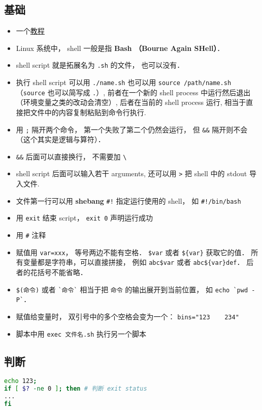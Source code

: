 
\begin{issues}
\issueDraft
\end{issues}


\subsection{基础}
\begin{itemize}
\item 一个\href{https://tldp.org/LDP/abs/html/why-shell.html}{教程}
\item Linux 系统中， shell 一般是指 \textbf{Bash （Bourne Again SHell）}．
\item shell script 就是拓展名为 \verb`.sh` 的文件， 也可以没有．
\item 执行 shell script 可以用 \verb`./name.sh` 也可以用 \verb`source /path/name.sh` （\verb|source| 也可以简写成 \verb|.|）, 前者在一个新的 shell process 中运行然后退出（环境变量之类的改动会清空）, 后者在当前的 shell process 运行, 相当于直接把文件中的内容复制粘贴到命令行执行.
\item 用 \verb|;| 隔开两个命令， 第一个失败了第二个仍然会运行， 但 \verb|&&| 隔开则不会（这个其实是逻辑与算符）．
\item \verb|&&| 后面可以直接换行， 不需要加 \verb|\|
\item shell script 后面可以输入若干 arguments, 还可以用 \verb`>` 把 shell 中的 stdout 导入文件.
\item 文件第一行可以用 \textbf{shebang} \verb`#!` 指定运行使用的 shell， 如 \verb`#!/bin/bash`
\item 用 \verb|exit| 结束 script， \verb`exit 0` 声明运行成功
\item 用 \verb`#` 注释
\item 赋值用 \verb`var=xxx`， 等号两边不能有空格． \verb|$var| 或者 \verb|${var}| 获取它的值． 所有变量都是字符串，可以直接拼接， 例如 \verb|abc$var| 或者 \verb|abc${var}def|． 后者的花括号不能省略．
\item \verb|$(命令)| 或者 \verb|`命令`| 相当于把 \verb|命令| 的输出展开到当前位置， 如 \verb|echo `pwd -P`|．
\item 赋值给变量时， 双引号中的多个空格会变为一个： \verb|bins="123    234"|
\item 脚本中用 \verb|exec 文件名.sh| 执行另一个脚本
\end{itemize}

\subsection{判断}
\begin{lstlisting}[language=bash]
echo 123;
if [ $? -ne 0 ]; then # 判断 exit status
...
fi
\end{lstlisting}

